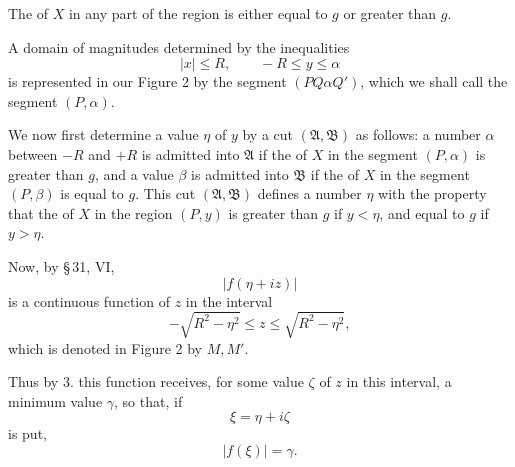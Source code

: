 

The  of $X$ in any part of the region is either equal to $g$ or greater than $g$.

A domain of magnitudes determined by the inequalities
\begin{equation}
 |x|\le R,\qquad -R\le y\le \alpha
\tag{7}
\end{equation}
is represented in our Figure 2 by the segment $(PQ\alpha Q')$, which we shall call the segment $(P,\alpha)$.


We now first determine a value $\eta$ of $y$ by a cut $(\mathfrak A,\mathfrak B)$ as follows: a number $\alpha$ between $-R$ and $+R$ is admitted into $\mathfrak A$ if the  of $X$ in the segment $(P,\alpha)$ is greater than $g$, and a value $\beta$ is admitted into $\mathfrak B$ if the  of $X$ in the segment $(P,\beta)$ is equal to $g$. This cut $(\mathfrak A,\mathfrak B)$ defines a number $\eta$ with the property that the  of $X$ in the region $(P,y)$ is greater than $g$ if $y<\eta$, and equal to $g$ if $y>\eta$.

Now, by \S\,31, VI,
\[
 |f(\eta+iz)|
\]
is a continuous function of $z$ in the interval
\begin{equation}
 -\sqrt{R^2-\eta^2}\le z\le \sqrt{R^2-\eta^2},
\tag{8}
\end{equation}
which is denoted in Figure 2 by $M,M'$.

Thus by 3. this function receives, for some value $\zeta$ of $z$ in this interval, a minimum value $\gamma$, so that, if
\[
 \xi=\eta+i\zeta
\]
is put,
\begin{equation}
 |f(\xi)|=\gamma.
\tag{9}
\end{equation}
